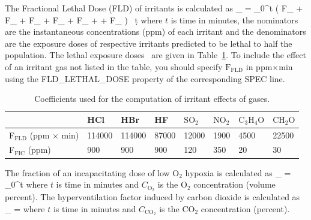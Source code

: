 \documentclass[11pt]{book}
\begin{document}
The Fractional Lethal Dose (FLD) of irritants is calculated as
\be
{}_ = \int_0^t \left(
        {F_} +
        {F_} +
         {F_} +
       {F_} +
       {F_} +
     +
      {F_}
    \right) \, \d t
\ee
where $t$ is time in minutes, the nominators are the instantaneous concentrations (ppm) of each irritant and
the denominators are the exposure doses of respective irritants predicted to be lethal to half the population.
The lethal exposure doses~\cite{SFPE:Purser} are given in Table~\ref{tbl:FIC}. To include the effect of an irritant gas not listed in the table,
you should specify $\mathrm{F_{FLD}}$ in ppm$\times$min using the {\ct FLD\_LETHAL\_DOSE} property of the corresponding {\ct SPEC} line.
\begin{table}[ht]
\caption[Coefficients used for the computation of irritant effects of gases]{Coefficients used for the computation of irritant effects of gases.}
\label{tbl:FIC}
\begin{center}
\begin{tabular}{|l|l|l|l|l|l|l|l|}
\hline & HCl & HBr & HF & $\mathrm{SO_2}$ & $\mathrm{NO_2}$ & $\mathrm{C_3H_4O}$ & $\mathrm{CH_2O}$  \\ \hline \hline
F${}_\mathrm{FLD}$ (ppm $\times$ min) & 114000 & 114000 & 87000 & 12000 & 1900 & 4500 & 22500 \\
F${}_\mathrm{FIC}$ (ppm) & 900 & 900 & 900 & 120 & 350 & 20 & 30 \\ \hline
\end{tabular}
\end{center}
\end{table}

The fraction of an incapacitating dose of low O${}_2$ hypoxia is calculated as
\be
{}_ =  \int_0^t 
\ee
where $t$ is time in minutes and $C_\mathrm{O_2}$ is the O${}_2$ concentration (volume percent).
The hyperventilation factor induced by carbon dioxide is calculated as
\be
{}_ =  \label{co2hyp}
\ee
where $t$ is time in minutes and $C_\mathrm{CO_2}$ is the CO${}_2$ concentration (percent).
\end{document}
